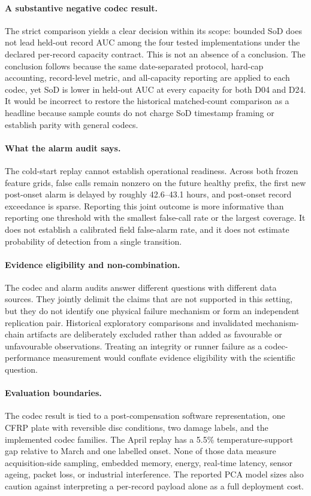 \paragraph{A substantive negative codec result.}
The strict comparison yields a clear decision within its scope: bounded SoD
does not lead held-out record AUC among the four tested implementations under
the declared per-record capacity contract. This is not an absence of a
conclusion. The conclusion follows because the same date-separated protocol,
hard-cap accounting, record-level metric, and all-capacity reporting are
applied to each codec, yet SoD is lower in held-out AUC at every capacity for
both D04 and D24. It would be incorrect to restore the historical
matched-count comparison as a headline because sample counts do not charge
SoD timestamp framing or establish parity with general codecs.

\paragraph{What the alarm audit says.}
The cold-start replay cannot establish operational readiness. Across both
frozen feature grids, false calls remain nonzero on the future healthy prefix,
the first new post-onset alarm is delayed by roughly 42.6--43.1 hours, and
post-onset record exceedance is sparse. Reporting this joint outcome is more
informative than reporting one threshold with the smallest false-call rate or
the largest coverage. It does not establish a calibrated field false-alarm
rate, and it does not estimate probability of detection from a single
transition.

\paragraph{Evidence eligibility and non-combination.}
The codec and alarm audits answer different questions with different data
sources. They jointly delimit the claims that are not supported in this
setting, but they do not identify one physical failure mechanism or form an
independent replication pair. Historical exploratory comparisons and
invalidated mechanism-chain artifacts are deliberately excluded rather than
added as favourable or unfavourable observations. Treating an integrity or
runner failure as a codec-performance measurement would conflate evidence
eligibility with the scientific question.

\paragraph{Evaluation boundaries.}
The codec result is tied to a post-compensation software representation, one
CFRP plate with reversible disc conditions, two damage labels, and the
implemented codec families. The April replay has a 5.5\% temperature-support
gap relative to March and one labelled onset. None of those data measure
acquisition-side sampling, embedded memory, energy, real-time latency, sensor
ageing, packet loss, or industrial interference. The reported PCA model sizes
also caution against interpreting a per-record payload alone as a full
deployment cost.

